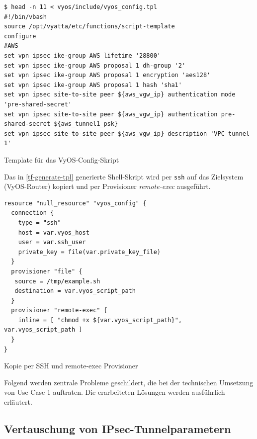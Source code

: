 \begin{listing}[h]
\begin{verbatim}
$ head -n 11 < vyos/include/vyos_config.tpl
#!/bin/vbash
source /opt/vyatta/etc/functions/script-template
configure
#AWS
set vpn ipsec ike-group AWS lifetime '28800'
set vpn ipsec ike-group AWS proposal 1 dh-group '2'
set vpn ipsec ike-group AWS proposal 1 encryption 'aes128'
set vpn ipsec ike-group AWS proposal 1 hash 'sha1'
set vpn ipsec site-to-site peer ${aws_vgw_ip} authentication mode 'pre-shared-secret'
set vpn ipsec site-to-site peer ${aws_vgw_ip} authentication pre-shared-secret ${aws_tunnel1_psk}
set vpn ipsec site-to-site peer ${aws_vgw_ip} description 'VPC tunnel 1'

\end{verbatim}
\caption{Template für das VyOS-Config-Skript}
\label{tf-generate-tpl}
\end{listing}\FloatBarrier

Das in \ref{tf-generate-tpl} generierte Shell-Skript wird per \texttt{ssh} auf das Zielsystem (VyOS-Router) kopiert und per Provisioner \textit{remote-exec} ausgeführt.
\begin{listing}[h]
\begin{verbatim}
resource "null_resource" "vyos_config" {
  connection {
    type = "ssh"
    host = var.vyos_host
    user = var.ssh_user
    private_key = file(var.private_key_file)
  }
  provisioner "file" {
   source = /tmp/example.sh
   destination = var.vyos_script_path
  }
  provisioner "remote-exec" {
    inline = [ "chmod +x ${var.vyos_script_path}", var.vyos_script_path ]
  }
}

\end{verbatim}
\caption{Kopie per \gls{SSH} und remote-exec Provisioner}
\label{tf-copy-tpl}
\end{listing}\FloatBarrier
\newpage
Folgend werden zentrale Probleme geschildert, die bei der technischen Umsetzung von Use Case 1 auftraten. Die erarbeiteten Lösungen werden ausführlich erläutert.

\newpage
\subsection{Vertauschung von IPsec-Tunnelparametern}\label{xml-tunnel-parameters}

